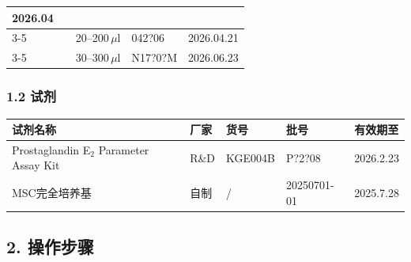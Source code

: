 \documentclass[UTF8,10pt,a4paper,fontset=fandol]{ctexart}
\newcommand{\fieldvalue}[1]{#1}
\newcommand{\handwritten}[1]{#1}
\begin{document}
\begin{center}
\begin{tabularx}{\textwidth}{|X|X|X|X|X|}
\fieldvalue{\handwritten{2026.04}}
\\ \cline{3-5}
&
&
\fieldvalue{\handwritten{20--200\,\(\mu\)l}} &
\fieldvalue{\handwritten{042?06}} &
\fieldvalue{\handwritten{2026.04.21}}
\\ \cline{3-5}
&
&
\fieldvalue{\handwritten{30--300\,\(\mu\)l}} &
\fieldvalue{\handwritten{N17?0?M}} &
\fieldvalue{\handwritten{2026.06.23}}
\\ \hline
\end{tabularx}
\normalsize

\subsubsection*{1.2 试剂}

\begin{tabularx}{\textwidth}{|X|X|X|X|X|}
\hline
试剂名称 & 厂家 & 货号 & 批号 & 有效期至 \\ \hline
Prostaglandin E$_2$ Parameter Assay Kit &
\fieldvalue{R\&D} &
\fieldvalue{KGE004B} &
\fieldvalue{\handwritten{P?2?08}} &
\fieldvalue{\handwritten{2026.2.23}}
\\ \hline
MSC完全培养基 &
\fieldvalue{自制} &
\fieldvalue{/} &
\fieldvalue{\handwritten{20250701-01}} &
\fieldvalue{\handwritten{2025.7.28}}
\\ \hline
\end{tabularx}

\subsection*{2. 操作步骤}


\end{center}
\end{document}
